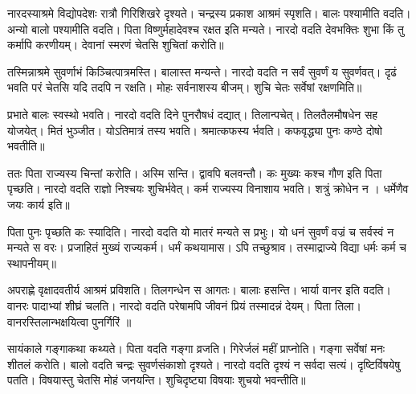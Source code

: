 \documentclass[12pt]{nextbook}
\begin{document}
\begin{readersection}{नारदस्याश्रमे विद्योपदेशः}
रात्रौ   गिरिशिखरे दृश्यते। चन्द्रस्य प्रकाश आश्रमं स्पृशति। बालः   पश्यामीति वदति। अन्यो बालो  पश्यामीति वदति। पिता विष्णुर्महादेवश्च रक्षत इति मन्यते। नारदो वदति देवभक्तिः शुभा किं तु कर्मापि करणीयम्। देवानां स्मरणं चेतसि शुचितां करोति॥

तस्मिन्नाश्रमे सुवर्णाभं किञ्चित्पात्रमस्ति। बालास्त मन्यन्ते। नारदो वदति न सर्वं सुवर्णं य सुवर्णवत्।  दृढं भवति परं चेतसि  यदि तदपि न रक्षति। मोहः सर्वनाशस्य बीजम्। शुचि चेतः सर्वेषां रक्षणमिति॥

प्रभाते बालः स्वस्थो भवति। नारदो वदति  दिने पुनरौषधं दद्यात्।  तिलान्पचेत्। तिलतैलमौषधेन सह योजयेत्।  मितं भुञ्जीत। योऽतिमात्रं  तस्य  भवति। श्रमात्कफस्य र्भवति। कफवृद्ध्या पुनः कण्ठे दोषो भवतीति॥

ततः पिता राज्यस्य चिन्तां करोति। अस्मि  सन्ति।  द्वावपि बलवन्तौ। कः  मुख्यः कश्च गौण इति पिता पृच्छति। नारदो वदति राज्ञो निश्चयः शुचिर्भवेत्।  कर्म राज्यस्य विनाशाय भवति। शत्रुं क्रोधेन न । धर्मेणैव जयः कार्य इति॥

पिता पुनः पृच्छति कः  स्यादिति। नारदो वदति यो  मातरं मन्यते स प्रभुः। यो धनं सुवर्णं वज्रं च सर्वस्वं न मन्यते स वरः। प्रजाहितं मुख्यं राज्यकर्म।   धर्मं कथयामास। ऽपि तच्छुश्राव। तस्माद्राज्ये विद्या धर्मः कर्म च स्थापनीयम्॥

अपराह्णे  वृक्षादवतीर्य आश्रमं प्रविशति। तिलगन्धेन स आगतः। बालाः हसन्ति। भार्या  वानर इति वदति। वानरः पादाभ्यां शीघ्रं चलति। नारदो वदति परेषामपि जीवनं प्रियं तस्मादन्नं देयम्। पिता तिला। वानरस्तिलान्भक्षयित्वा पुनर्गिरिं ॥

सायंकाले गङ्गाकथा कथ्यते। पिता वदति गङ्गा  व्रजति। गिरेर्जलं महीं प्राप्नोति।  गङ्गा सर्वेषां मनः शीतलं करोति। बालो वदति चन्द्रः सुवर्णसंकाशो दृश्यते। नारदो वदति दृश्यं न सर्वदा सत्यं। दृष्टिर्विषयेषु पतति। विषयास्तु चेतसि मोहं जनयन्ति। शुचिदृष्ट्या विषयाः शुचयो भवन्तीति॥


\end{readersection}
\end{document}
